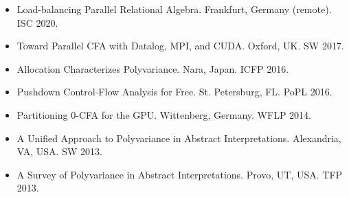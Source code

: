 \begin{itemize}
\itemsep=0.1cm
\item Load-balancing Parallel Relational Algebra. Frankfurt, Germany (remote). ISC 2020.
\item Toward Parallel CFA with Datalog, MPI, and CUDA. Oxford, UK. SW 2017.
\item Allocation Characterizes Polyvariance. Nara, Japan. ICFP 2016.
\item Pushdown Control-Flow Analysis for Free. St. Petersburg, FL. PoPL 2016.
\item Partitioning 0-CFA for the GPU. Wittenberg, Germany. WFLP 2014.
\item A Unified Approach to Polyvariance in Abstract Interpretations. Alexandria, VA, USA. SW 2013.
\item A Survey of Polyvariance in Abstract Interpretations. Provo, UT, USA. TFP 2013.
\end{itemize}
